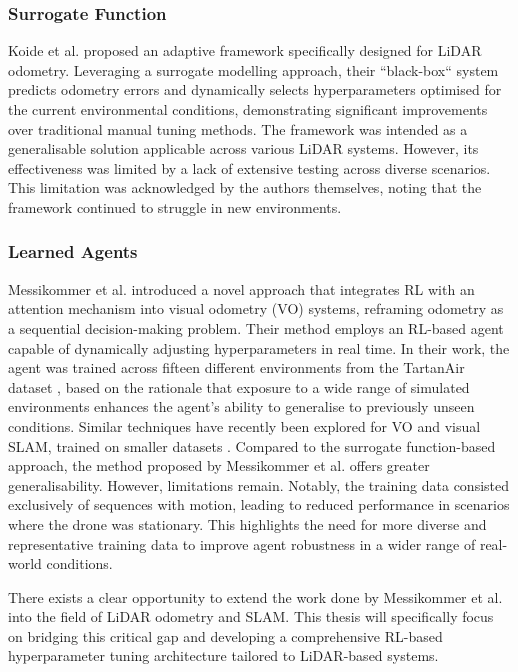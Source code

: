 \documentclass[12pt]{article}
\begin{document}
\subsubsection{Surrogate Function}
Koide et al. \cite{koide_2021_adaptive} proposed an adaptive framework specifically designed for LiDAR odometry. Leveraging a surrogate modelling approach, their ``black-box`` system predicts odometry errors and dynamically selects hyperparameters optimised for the current environmental conditions, demonstrating significant improvements over traditional manual tuning methods. The framework was intended as a generalisable solution applicable across various LiDAR systems. However, its effectiveness was limited by a lack of extensive testing across diverse scenarios. This limitation was acknowledged by the authors themselves, noting that the framework continued to struggle in new environments. 

\subsubsection{Learned Agents}
Messikommer et al. \cite{nicomessikommer_2024_reinforcement} introduced a novel approach that integrates RL with an attention mechanism into visual odometry (VO) systems, reframing odometry as a sequential decision-making problem. Their method employs an RL-based agent capable of dynamically adjusting hyperparameters in real time. In their work, the agent was trained across fifteen different environments from the TartanAir dataset \cite{wang_2020_tartanair}, based on the rationale that exposure to a wide range of simulated environments enhances the agent’s ability to generalise to previously unseen conditions.  Similar techniques have recently been explored for VO and visual SLAM, trained on smaller datasets \cite{li_2025_uampc, ma_2025_mambadqn}. Compared to the surrogate function-based approach, the method proposed by Messikommer et al. offers greater generalisability. However, limitations remain. Notably, the training data consisted exclusively of sequences with motion, leading to reduced performance in scenarios where the drone was stationary. This highlights the need for more diverse and representative training data to improve agent robustness in a wider range of real-world conditions. 

There exists a clear opportunity to extend the work done by Messikommer et al. into the field of LiDAR odometry and SLAM. This thesis will specifically focus on bridging this critical gap and developing a comprehensive RL-based hyperparameter tuning architecture tailored to LiDAR-based systems.
\end{document}

